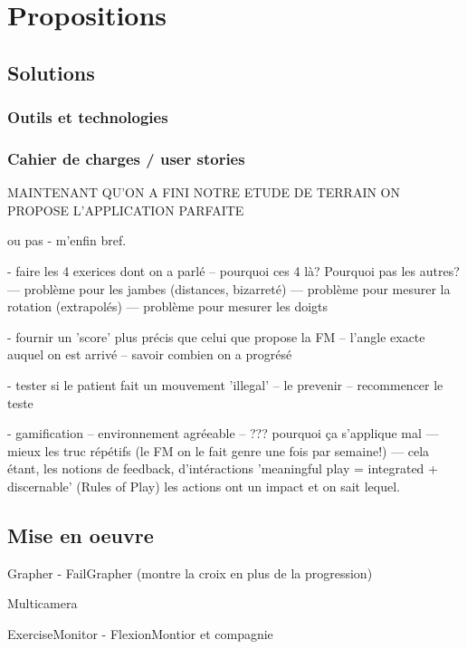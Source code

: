\documentclass[french,12pt]{report}
\begin{document}
	\chapter{Propositions}
	
		\section{Solutions}
    \subsection{Outils et technologies} 
    
    
		\subsection{Cahier de charges / user stories} 		%
		
		MAINTENANT QU'ON A FINI NOTRE ETUDE DE TERRAIN ON PROPOSE L'APPLICATION PARFAITE 
		
		ou pas - m'enfin bref.
		
		- faire les 4 exerices dont on a parlé
		-- pourquoi ces 4 là? Pourquoi pas les autres?
		--- problème pour les jambes (distances, bizarreté)
		--- problème pour mesurer la rotation (extrapolés)
		--- problème pour mesurer les doigts 
		
		- fournir un 'score' plus précis que celui que propose la FM
		-- l'angle exacte auquel on est arrivé
		-- savoir combien on a progrésé
		
		- tester si le patient fait un mouvement 'illegal'
		-- le prevenir
		-- recommencer le teste
		
		
		- gamification
		-- environnement agréeable
		-- ??? pourquoi ça s'applique mal
		--- mieux les truc répétifs (le FM on le fait genre une fois par semaine!)
		--- cela étant, les notions de feedback, d'intéractions 
			'meaningful play = integrated + discernable' (Rules of Play) les actions ont un 
			impact et on sait lequel. 
		
		\section{Mise en oeuvre} 	%

		Grapher
		- FailGrapher (montre la croix en plus de la progression)
		
		Multicamera
		
		ExerciseMonitor
		- FlexionMontior et compagnie
		
\end{document}
